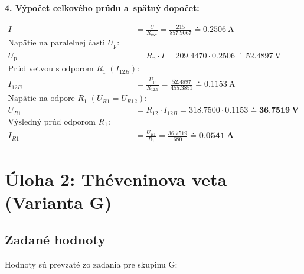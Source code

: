 \documentclass[12pt,a4paper]{article}
\newcommand{\R}[1]{R_{\mathrm{#1}}}
\begin{document}
\textbf{4. Výpočet celkového prúdu a~spätný dopočet:}

\begin{align*}
    I                                                    & = \frac{U}{\R{ekv}} = \frac{215}{\num{857,9067}} \doteq \qty{0,2506}{\ampere}                        \\[1em]
    \text{Napätie na paralelnej časti } U_{\mathrm{p}}:  &                                                                                                      \\
    U_{\mathrm{p}}                                       & = \R{p} \cdot I = \num{209,4470} \cdot \num{0,2506} \doteq \qty{52,4897}{\volt}                      \\[1em]
    \text{Prúd vetvou s~odporom } R_1 \; (I_{12B}):      &                                                                                                      \\
    I_{12B}                                              & = \frac{U_{\mathrm{p}}}{R_{12B}} = \frac{\num{52,4897}}{\num{455,3851}} \doteq \qty{0,1153}{\ampere} \\[1em]
    \text{Napätie na odpore } R_1 \; (U_{R1} = U_{R12}): &                                                                                                      \\
    U_{R1}                                               & = R_{12} \cdot I_{12B} = \num{318,7500} \cdot \num{0,1153} \doteq \mathbf{\qty{36,7519}{\volt}}      \\[1em]
    \text{Výsledný prúd odporom } R_1:                   &                                                                                                      \\
    I_{R1}                                               & = \frac{U_{R1}}{R_1} = \frac{\num{36,7519}}{680} \doteq \mathbf{\qty{0,0541}{\ampere}}
\end{align*}

\newpage

\section*{Úloha 2: Théveninova veta (Varianta G)}

\subsection*{Zadané hodnoty}
Hodnoty sú prevzaté zo zadania pre skupinu G:
\end{document}
